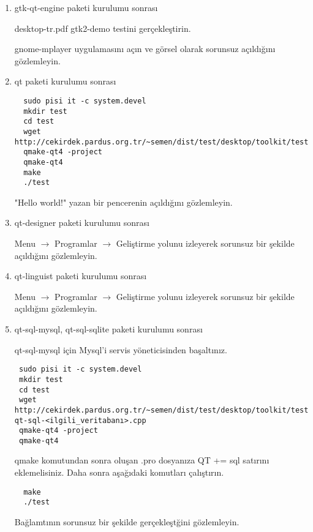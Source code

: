\documentclass[a4paper,10pt]{article}
\begin{document}
\begin{enumerate}
\item gtk-qt-engine paketi kurulumu sonrası

desktop-tr.pdf gtk2-demo testini gerçekleştirin.

gnome-mplayer uygulamasını açın ve görsel olarak sorunsuz açıldığını gözlemleyin.

 \item qt paketi kurulumu sonrası

\begin{verbatim}
  sudo pisi it -c system.devel
  mkdir test
  cd test
  wget http://cekirdek.pardus.org.tr/~semen/dist/test/desktop/toolkit/test.cpp
  qmake-qt4 -project
  qmake-qt4
  make
  ./test
\end{verbatim}

"Hello world!" yazan bir pencerenin açıldığını gözlemleyin.
\item qt-designer paketi kurulumu sonrası

Menu $\rightarrow$ Programlar $\rightarrow$ Geliştirme yolunu izleyerek sorunsuz bir şekilde açıldığını gözlemleyin.

\item qt-linguist paketi kurulumu sonrası

Menu $\rightarrow$ Programlar $\rightarrow$ Geliştirme yolunu izleyerek sorunsuz bir şekilde açıldığını gözlemleyin.

\item qt-sql-mysql, qt-sql-sqlite paketi kurulumu sonrası

qt-sql-mysql için Mysql'i servis yöneticisinden başaltınız.
\begin{verbatim}
 sudo pisi it -c system.devel
 mkdir test
 cd test
 wget http://cekirdek.pardus.org.tr/~semen/dist/test/desktop/toolkit/test-qt-sql-<ilgili_veritabanı>.cpp
 qmake-qt4 -project
 qmake-qt4	
\end{verbatim}
qmake komutundan sonra oluşan .pro dosyanıza QT += sql satırını eklemelisiniz. Daha sonra aşağıdaki komutları çalıştırın.
\begin{verbatim}
  make
  ./test
\end{verbatim}

Bağlamtının sorunsuz bir şekilde gerçekleştğini gözlemleyin.

\end{enumerate}
\end{document}
